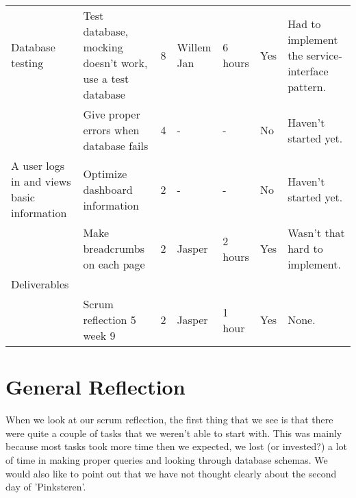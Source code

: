 \documentclass[a4paper]{report}
\begin{document}
\begin{landscape}
\begin{longtable}{p{3cm}|p{5cm}|l|l|l|l|p{7cm}}
Database testing 
& Test database, mocking doesn't work, use a test database & 8 & Willem Jan & 6 hours & Yes & Had to implement the service-interface pattern.\\
& Give proper errors when database fails & 4 & - & - & No & Haven't started yet.\\
\hline

A user logs in and views basic information 
& Optimize dashboard information & 2 & - & - & No & Haven't started yet.\\
& Make breadcrumbs on each page & 2 & Jasper & 2 hours & Yes & Wasn't that hard to implement.\\
\hline

Deliverables \\
& Scrum reflection 5 week 9 & 2 & Jasper & 1 hour & Yes & None.\\
\hline
\end{longtable}
\end{landscape}

\section*{General Reflection}
When we look at our scrum reflection, the first thing that we see is that there were quite a couple of tasks that we weren't able to start with. This was mainly because most tasks took more time then we expected, we lost (or invested?) a lot of time in making proper queries and looking through database schemas. We would also like to point out that we have not thought clearly about the second day of 'Pinksteren'.\\
\end{document}
